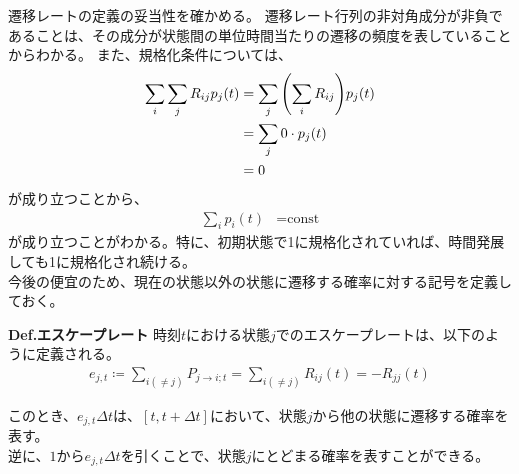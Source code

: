 \documentclass[a4paper,11pt]{jsarticle}
\numberwithin{equation}{section}
\begin{document}
遷移レートの定義の妥当性を確かめる。
遷移レート行列の非対角成分が非負であることは、その成分が状態間の単位時間当たりの遷移の頻度を表していることからわかる。
また、規格化条件については、
\begin{align}
    \sum_{i} \sum_{j} R_{ij} p_j(t) &= \sum_{j} \qty(\sum_{i} R_{ij}) p_j(t) \\
    &= \sum_{j} 0 \cdot p_j(t) \\
    &= 0
\end{align}
が成り立つことから、
\begin{align}
    \sum_{i} p_{i}(t) &= \text{const} 
\end{align}
が成り立つことがわかる。特に、初期状態で1に規格化されていれば、時間発展しても1に規格化され続ける。\\

今後の便宜のため、現在の状態以外の状態に遷移する確率に対する記号を定義しておく。
\begin{itembox}[l]{\textbf{Def.エスケープレート}}
    時刻$t$における状態$j$でのエスケープレートは、以下のように定義される。
    \begin{align}
        e_{j,t} \coloneqq \sum_{i (\neq j)} P_{j \to i ;t}= \sum_{i (\neq j)} R_{ij}(t) = -R_{jj}(t)
    \end{align}
\end{itembox}
このとき、$e_{j,t} \Delta t$は、$[t,t+\Delta t]$において、状態$j$から他の状態に遷移する確率を表す。\\
逆に、$1$から$e_{j,t} \Delta t$を引くことで、状態$j$にとどまる確率を表すことができる。
\end{document}
